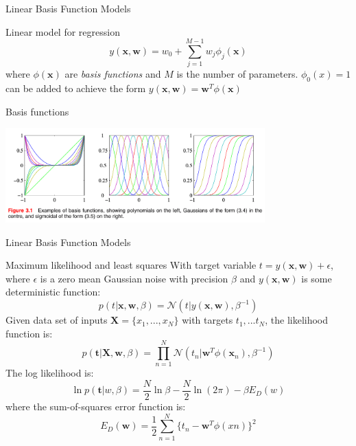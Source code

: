 \documentclass[9pt]{beamer}
\title{\hmwkClass}
\subtitle{\hmwkTitle}
\date{Lecture date: \hmwkDueDate}
\author[\hmwkAuthorLastName]{\hmwkAuthorFullName}
\begin{document}
\maketitle

\begin{frame}{Linear Basis Function Models}
    \begin{alertblock}{Linear model for regression}
        \[ y(\mathbf{x}, \mathbf{w}) = w_0 + \sum_{j=1}^{M-1} w_j \phi_j(\mathbf{x}) \tag{3.3} \label{eq:3.3} \]
        where $\phi(\mathbf{x})$ are \textit{basis functions} and $M$ is the number of parameters. $\phi_0(x) = 1$ can be added to achieve the form $y(\mathbf{x}, \mathbf{w}) = \mathbf{w}^T \phi(\mathbf{x})$
    \end{alertblock}
    \begin{alertblock}{Basis functions}
        \begin{center}
            \setlength{\fboxsep}{0.5pt} %
            \setlength{\fboxrule}{0.5pt}
            \includegraphics[width=10cm,fbox]{../images/Bishop_MachineLearning_Figure3-1.png} %
        \end{center}
    \end{alertblock}
\end{frame}

\begin{frame}{Linear Basis Function Models}
    \begin{alertblock}{Maximum likelihood and least squares}
        With target variable $t = y(\mathbf{x}, \mathbf{w}) + \epsilon$, where $\epsilon$ is a zero mean Gaussian noise with precision $\beta$ and $y(\mathbf{x}, \mathbf{w})$ is some deterministic function:
        \[ p(t | \mathbf{x}, \mathbf{w}, \beta) = \mathcal{N}\left( t | y(\mathbf{x}, \mathbf{w}), \beta^{-1} \right) \tag{3.8} \label{eq:3.8} \]
        Given data set of inputs $\mathbf{X} = \{x_1,...,x_N\}$ with targets $t_1,...t_N$, the likelihood function is:
        \[ p(\mathbf{t} | \mathbf{X}, \mathbf{w}, \beta) = \prod_{n=1}^{N}\mathcal{N}(t_n | \mathbf{w}^T \phi(\mathbf{x}_n), \beta^{-1}) \tag{3.10} \label{eq:3.10} \]
        The log likelihood is:
        \[ \ln p(\mathbf{t}|w,\beta) = \frac{N}{2} \ln \beta - \frac{N}{2} \ln(2\pi) - \beta E_D(w) \tag{3.11} \label{eq:3.11} \]
        where the sum-of-squares error function is:
        \[ E_D(\mathbf{w}) = \frac{1}{2} \sum_{n=1}^{N} \{ t_n - \mathbf{w}^T \phi(xn) \}^2 \tag{3.12} \label{eq:3.12} \]
    \end{alertblock}
\end{frame}
\end{document}
